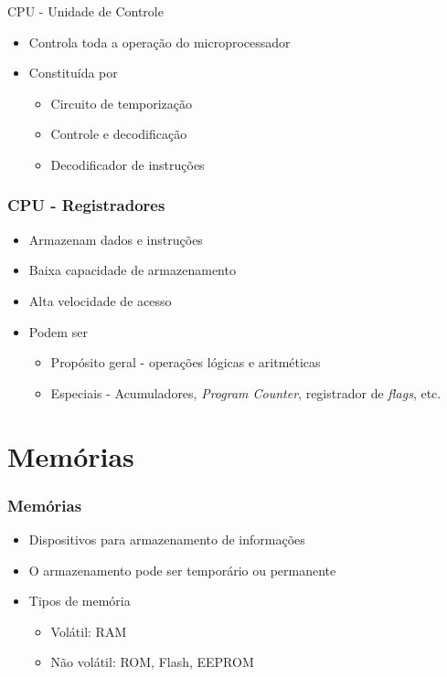 \documentclass[aspectratio=169,
				xcolor=table]{beamer}
\begin{document}
		\begin{frame}{CPU - Unidade de Controle}
			\begin{itemize}
				\item Controla toda a operação do microprocessador
				\vspace{1em}
				\item Constituída por
				\begin{itemize}
					\item Circuito de temporização
					\item Controle e decodificação
					\item Decodificador de instruções
				\end{itemize}
			\end{itemize}
		\end{frame}
		
		\begin{frame}
			\frametitle{CPU - Registradores}
			\begin{itemize}
				\item Armazenam dados e instruções
				\vspace{1em}
				\item Baixa capacidade de armazenamento
				\vspace{1em}
				\item Alta velocidade de acesso
				\vspace{1em}
				\item Podem ser
				\begin{itemize}
					\item Propósito geral - operações lógicas e aritméticas
					\item Especiais - Acumuladores, \textit{Program Counter}, registrador de \textit{flags}, etc.
				\end{itemize}
				
			\end{itemize}
		\end{frame}
		
	\section{Memórias}
	
		\begin{frame}
			\frametitle{Memórias}
			\begin{itemize}
				\item Dispositivos para armazenamento de informações
				\vspace{1em}
				\item O armazenamento pode ser temporário ou permanente
				\vspace{1em}
				\item Tipos de memória 
				\begin{itemize}
					\item Volátil: RAM 
					\item Não volátil: ROM, Flash, EEPROM
				\end{itemize}

			\end{itemize}
		\end{frame}
\end{document}

